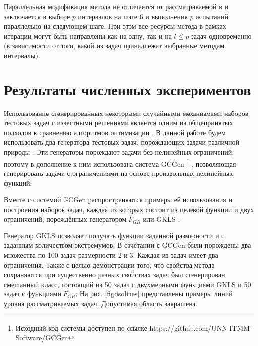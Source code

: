 \documentclass[11pt, oneside, a4paper]{article}
\begin{document}
Параллельная модификация метода не отличается от рассматриваемой в \cite{BarkalovStrongin2018}
и заключается в выборе \(p\) интервалов на шаге 6 и выполнения \(p\) испытаний параллельно
на следующем шаге. При этом все ресурсы метода в рамках итерации могут быть направлены как на одну, так и
на \(l\leqslant p\) задач одновременно (в зависимости от того, какой из задач принадлежат выбранные методам интервалы).

\section{Результаты численных экспериментов}

Использование сгенерированных некоторыми случайными механизмами
наборов тестовых задач с известными решениями является одним из общепринятых подходов
к сравнению алгоритмов оптимизации \cite{Beiranvand2017}. В данной работе
будем использовать два генератора тестовых задач, порождающих задачи различной природы \cite{grishaginClass, Gaviano2003}.
Эти генераторы порождают задачи без нелинейных ограничений, поэтому в дополнение к ним использована
система GCGen \footnote{Исходный код системы доступен по ссылке https://github.com/UNN-ITMM-Software/GCGen} \cite{GergelBarkalov2019}, позволяющая генерировать задачи с ограничениями на основе произвольных нелинейных
функций.

Вместе с системой GCGen распространяются примеры её использования и построения
наборов задач, каждая из которых состоит из целевой функции и двух ограничений,
порождённых генератором \(F_{GR}\) \cite{grishaginClass} или GKLS \cite{Gaviano2003}.


Генератор GKLS \cite{Gaviano2003} позволяет получать функции заданной размерности и с заданным количеством экстремумов.
В сочетании с GCGen были порождены два множества по 100 задач размерности 2 и 3. Каждая из задач имеет два ограничения.
Также с целью демонстрации того, что свойства метода сохраняются при существенно разных свойствах задач
был сгенерирован смешанный класс, состоящий из 50 задач с двухмерными функциями GKLS и 50 задач с функциями \(F_{GR}\).
На рис. \ref{fig:isolines} представлены примеры линий уровня рассматриваемых задач. Допустимая область закрашена.
\end{document}
